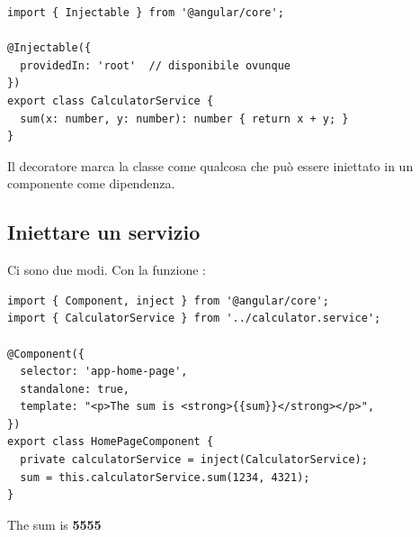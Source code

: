 \begin{affianco}[0.46][c]
\codicepiccolo
\begin{lstlisting}[style=ts, name=calculator.service.ts]
import { Injectable } from '@angular/core';

@Injectable({
  providedIn: 'root'  // disponibile ovunque
})
export class CalculatorService {
  sum(x: number, y: number): number { return x + y; }
}
\end{lstlisting}
\risultato
\begin{immagine}
\end{immagine}
\end{affianco}

Il decoratore  marca la classe come qualcosa che può essere
iniettato in un componente come dipendenza.

\subsection{Iniettare un servizio}

Ci sono due modi. Con la funzione :

\begin{affianco}[0.6][c]
\codicepiccolo
\begin{lstlisting}[style=ts, name=home-page.component.ts]
import { Component, inject } from '@angular/core';
import { CalculatorService } from '../calculator.service';

@Component({
  selector: 'app-home-page',
  standalone: true,
  template: "<p>The sum is <strong>{{sum}}</strong></p>",
})
export class HomePageComponent {
  private calculatorService = inject(CalculatorService);
  sum = this.calculatorService.sum(1234, 4321);
}
\end{lstlisting}
\risultato
\begin{browser}[localhost:4200]
  The sum is \textbf{5555}
\end{browser}
\end{affianco}

